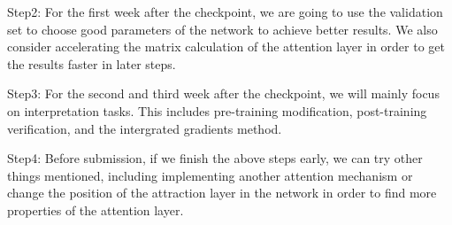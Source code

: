 \documentclass[12pt]{article}
\begin{document}
Step2: For the first week after the checkpoint, we are going to use the validation set to choose good parameters of the network to achieve better results. We also consider accelerating the matrix calculation of the attention layer in order to get the results faster in later steps.

Step3: For the second and third week after the checkpoint, we will mainly focus on interpretation tasks. This includes pre-training modification, post-training verification, and the intergrated gradients method.

Step4: Before submission, if we finish the above steps early, we can try other things mentioned, including implementing another attention mechanism or change the position of the attraction layer in the network in order to find more properties of the attention layer.

\newpage



\end{document}
